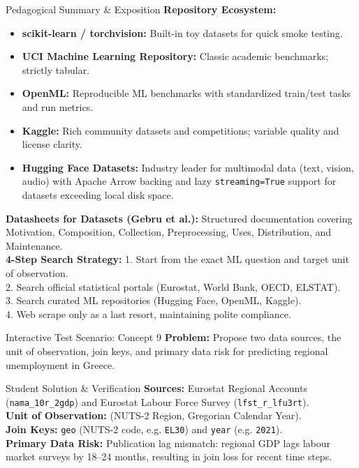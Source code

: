 \documentclass[11pt,a4paper]{article}
\begin{document}
\begin{evalbox}{Pedagogical Summary \& Exposition}
\textbf{Repository Ecosystem:}
\begin{itemize}
    \item \textbf{scikit-learn / torchvision:} Built-in toy datasets for quick smoke testing.
    \item \textbf{UCI Machine Learning Repository:} Classic academic benchmarks; strictly tabular.
    \item \textbf{OpenML:} Reproducible ML benchmarks with standardized train/test tasks and run metrics.
    \item \textbf{Kaggle:} Rich community datasets and competitions; variable quality and license clarity.
    \item \textbf{Hugging Face Datasets:} Industry leader for multimodal data (text, vision, audio) with Apache Arrow backing and lazy \texttt{streaming=True} support for datasets exceeding local disk space.
\end{itemize}
\textbf{Datasheets for Datasets (Gebru et al.):} Structured documentation covering Motivation, Composition, Collection, Preprocessing, Uses, Distribution, and Maintenance.\\
\textbf{4-Step Search Strategy:}
1. Start from the exact ML question and target unit of observation.\\
2. Search official statistical portals (Eurostat, World Bank, OECD, ELSTAT).\\
3. Search curated ML repositories (Hugging Face, OpenML, Kaggle).\\
4. Web scrape only as a last resort, maintaining polite compliance.
\end{evalbox}

\begin{testbox}{Interactive Test Scenario: Concept 9}
\textbf{Problem:} Propose two data sources, the unit of observation, join keys, and primary data risk for predicting regional unemployment in Greece.
\end{testbox}

\begin{evalbox}{Student Solution \& Verification}
\textbf{Sources:} Eurostat Regional Accounts (\texttt{nama\_10r\_2gdp}) and Eurostat Labour Force Survey (\texttt{lfst\_r\_lfu3rt}).\\
\textbf{Unit of Observation:} (NUTS-2 Region, Gregorian Calendar Year).\\
\textbf{Join Keys:} \texttt{geo} (NUTS-2 code, e.g. \texttt{EL30}) and \texttt{year} (e.g. \texttt{2021}).\\
\textbf{Primary Data Risk:} Publication lag mismatch: regional GDP lags labour market surveys by 18--24 months, resulting in join loss for recent time steps.
\end{evalbox}
\end{document}
